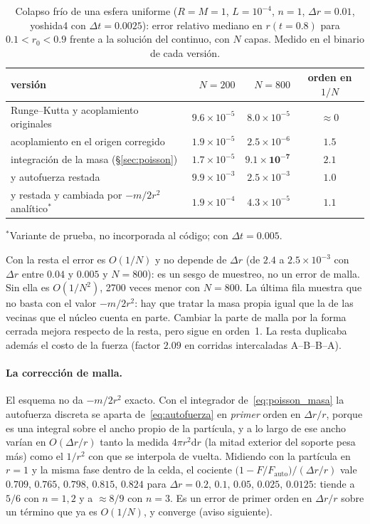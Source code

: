 \documentclass[11pt,a4paper]{article}
\newcommand{\dd}{\mathrm{d}}
\begin{document}
\begin{table}[htbp]
\centering
\caption{Colapso frío de una esfera uniforme ($R=M=1$, $L=10^{-4}$, $n=1$,
$\Delta r=0.01$, yoshida4 con $\Delta t=0.0025$): error relativo mediano en $r(t=0.8)$
para $0.1<r_0<0.9$ frente a la solución del continuo, con $N$ capas. Medido en el binario
de cada versión.}
\label{tab:colapso}
\begin{tabular}{lrrc}
\toprule
versión & $N=200$ & $N=800$ & orden en $1/N$ \\
\midrule
Runge--Kutta y acoplamiento originales & $9.6\times10^{-5}$ & $8.0\times10^{-5}$ & $\approx0$ \\
acoplamiento en el origen corregido & $1.9\times10^{-5}$ & $2.5\times10^{-6}$ & $1.5$ \\
integración de la masa (\S\ref{sec:poisson}) & $1.7\times10^{-5}$ & $\mathbf{9.1\times10^{-7}}$ & $2.1$ \\
\quad y autofuerza restada & $9.9\times10^{-3}$ & $2.5\times10^{-3}$ & $1.0$ \\
\quad y restada y cambiada por $-m/2r^{2}$ analítico$^{*}$ & $1.9\times10^{-4}$ & $4.3\times10^{-5}$ & $1.1$ \\
\bottomrule
\end{tabular}

\smallskip
{\footnotesize $^{*}$Variante de prueba, no incorporada al código; con $\Delta t=0.005$.}
\end{table}

Con la resta el error es $O(1/N)$ y no depende de $\Delta r$ (de $2.4$ a
$2.5\times10^{-3}$ con $\Delta r$ entre $0.04$ y $0.005$ y $N=800$): es un sesgo de
muestreo, no un error de malla. Sin ella es $O(1/N^{2})$, 2700 veces menor con $N=800$.
La última fila muestra que no basta con el valor $-m/2r^{2}$: hay que tratar la masa
propia igual que la de las vecinas que el núcleo cuenta en parte. Cambiar la parte de
malla por la forma cerrada mejora respecto de la resta, pero sigue en orden~1. La resta
duplicaba además el costo de la fuerza (factor $2.09$ en corridas intercaladas
A--B--B--A).

\paragraph{La corrección de malla.} El esquema no da $-m/2r^{2}$ exacto. Con el integrador
de~\eqref{eq:poisson_masa} la autofuerza discreta se aparta de~\eqref{eq:autofuerza} en
\emph{primer} orden en $\Delta r/r$, porque es una integral sobre el ancho propio de la
partícula, y a lo largo de ese ancho varían en $O(\Delta r/r)$ tanto la medida
$4\pi r^{2}\dd r$ (la mitad exterior del soporte pesa más) como el $1/r^{2}$ con que se
interpola de vuelta. Midiendo con la partícula en $r=1$ y la misma fase dentro de la celda,
el cociente $\big(1-F/F_{\text{auto}}\big)/(\Delta r/r)$ vale $0.709$, $0.765$, $0.798$,
$0.815$, $0.824$ para $\Delta r=0.2,\,0.1,\,0.05,\,0.025,\,0.0125$: tiende a $5/6$ con
$n=1,2$ y a $\approx8/9$ con $n=3$. Es un error de primer orden en $\Delta r/r$ sobre un
término que ya es $O(1/N)$, y converge (aviso siguiente).
\end{document}
